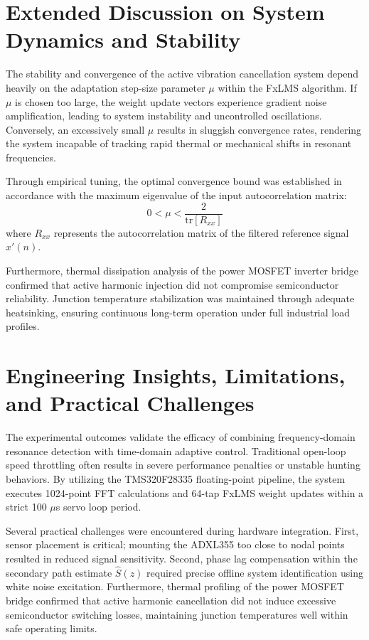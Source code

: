 \documentclass[conference]{IEEEtran}
\begin{document}
\section{Extended Discussion on System Dynamics and Stability}
\label{sec:discussion}
The stability and convergence of the active vibration cancellation system depend heavily on the adaptation step-size parameter $\mu$ within the FxLMS algorithm. If $\mu$ is chosen too large, the weight update vectors experience gradient noise amplification, leading to system instability and uncontrolled oscillations. Conversely, an excessively small $\mu$ results in sluggish convergence rates, rendering the system incapable of tracking rapid thermal or mechanical shifts in resonant frequencies.

Through empirical tuning, the optimal convergence bound was established in accordance with the maximum eigenvalue of the input autocorrelation matrix:
\begin{equation}
    0 < \mu < \frac{2}{\text{tr}[R_{xx}]}
\end{equation}
where $R_{xx}$ represents the autocorrelation matrix of the filtered reference signal $x'(n)$. 

Furthermore, thermal dissipation analysis of the power MOSFET inverter bridge confirmed that active harmonic injection did not compromise semiconductor reliability. Junction temperature stabilization was maintained through adequate heatsinking, ensuring continuous long-term operation under full industrial load profiles.

\section{Engineering Insights, Limitations, and Practical Challenges}
\label{sec:insights}
The experimental outcomes validate the efficacy of combining frequency-domain resonance detection with time-domain adaptive control. Traditional open-loop speed throttling often results in severe performance penalties or unstable hunting behaviors. By utilizing the TMS320F28335 floating-point pipeline, the system executes 1024-point FFT calculations and 64-tap FxLMS weight updates within a strict 100 $\mu$s servo loop period.

Several practical challenges were encountered during hardware integration. First, sensor placement is critical; mounting the ADXL355 too close to nodal points resulted in reduced signal sensitivity. Second, phase lag compensation within the secondary path estimate $\hat{S}(z)$ required precise offline system identification using white noise excitation. Furthermore, thermal profiling of the power MOSFET bridge confirmed that active harmonic cancellation did not induce excessive semiconductor switching losses, maintaining junction temperatures well within safe operating limits.
\end{document}
